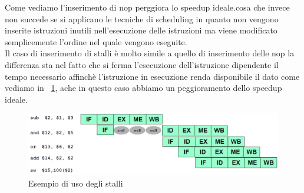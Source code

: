 Come vediamo l'inserimento di nop perggiora lo speedup ideale.cosa che invece non succede se si applicano le tecniche di scheduling in quanto non vengono inserite istruzioni inutili nell'esecuzione  delle istruzioni ma viene modificato semplicemente l'ordine nel quale vengono eseguite.\\
Il caso di inserimento di stalli è molto simile a quello di inserimento delle nop la differenza sta nel fatto che si ferma l'esecuzione dell'istruzione dipendente il tempo necessario affinchè l'istruzione in esecuzione renda disponibile il dato come vediamo in \figurename~\ref{fig:stall}, ache in questo caso abbiamo un peggioramento dello speedup ideale.
\begin{figure}[tb]
\centering
\includegraphics[scale=0.45]{img/stall.png}
\caption{Esempio di uso degli stalli}\label{fig:stall}
\end{figure}
